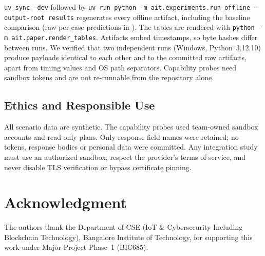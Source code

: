 \documentclass[conference]{IEEEtran}
\begin{document}
\texttt{uv sync --dev} followed by
\texttt{uv run python -m ait.experiments.run\_offline --output-root results}
regenerates every offline artifact, including the baseline comparison
(raw per-case predictions in
). The
tables are rendered with
\texttt{python -m ait.paper.render\_tables}. Artifacts embed timestamps,
so byte hashes differ between runs. We verified that two independent runs
(Windows, Python~3.12.10) produce payloads identical to each other and to
the committed raw artifacts, apart from timing values and OS path
separators. Capability probes need sandbox tokens and are not re-runnable
from the repository alone.

\subsection*{Ethics and Responsible Use}

All scenario data are synthetic. The capability probes used team-owned
sandbox accounts and read-only plans. Only response field names were
retained; no tokens, response bodies or personal data were committed.
Any integration study must use an authorized sandbox, respect the
provider's terms of service, and never disable TLS verification or
bypass certificate pinning.


\section*{Acknowledgment}

The authors thank the Department of CSE (IoT \& Cybersecurity
Including Blockchain Technology), Bangalore Institute of Technology,
for supporting this work under Major Project Phase~1 (BIC685).
\end{document}

